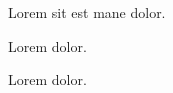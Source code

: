 \documentclass{article}
\begin{document}

Lorem sit est mane  dolor.

Lorem  dolor.

Lorem  dolor.
\end{document}
